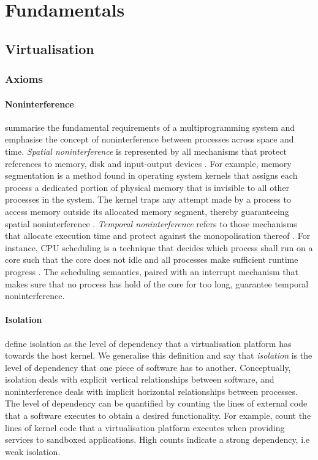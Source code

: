 \chapter{Fundamentals}
\section{Virtualisation}
\subsection{Axioms}
\label{ch:fundamentals/virtualisation/axioms}
\subsubsection{Noninterference}
\label{ch:fundamentals/virtualisation/axioms/noninterference}
\textcite{10.1145/368481.368502} summarise the fundamental requirements of a multiprogramming 
system and emphasise the concept of noninterference between processes across space and time. 
\textit{Spatial noninterference} is represented by all mechanisms that protect references to memory, 
disk and input-output devices \cite{10.1145/368481.368502}. For example, memory segmentation 
is a method found in operating system kernels that assigns each process a dedicated portion
of physical memory that is invisible to all other processes in the system. The kernel traps 
any attempt made by a process to access memory outside its allocated memory segment, thereby 
guaranteeing spatial noninterference \cite{10.5555/2490781}. \textit{Temporal noninterference} refers
to those mechanisms that allocate execution time and protect against the monopolisation thereof 
\cite{10.1145/368481.368502}. For instance, CPU scheduling is a technique that decides which process 
shall run on a core such that the core does not idle and all processes make sufficient 
runtime progress \cite{10.5555/2490781}. The scheduling semantics, paired with an interrupt mechanism 
that makes sure that no process has hold of the core for too long, guarantee temporal noninterference.

\subsubsection{Isolation}
\label{ch:fundamentals/virtualisation/axioms/isolation}
\textcite{10.1145/3381052.3381315} define isolation as the level of dependency that a virtualisation 
platform has towards the host kernel. We generalise this definition and say that \textit{isolation} 
is the level of dependency that one piece of software has to another. Conceptually, isolation 
deals with explicit vertical relationships between software, and noninterference deals with 
implicit horizontal relationships between processes. The level of dependency can be quantified by 
counting the lines of external code that a software executes to obtain a desired functionality. 
For example, \textcite{10.1145/3381052.3381315} count the lines of kernel code 
that a virtualisation platform executes when providing services to sandboxed applications. 
High counts indicate a strong dependency, i.e weak isolation.  

